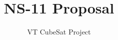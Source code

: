 \documentclass[12pt,a4paper]{article}
\author{VT CubeSat Project}
\title{NS-11 Proposal}
\begin{document}
\maketitle
\pagebreak
\tableofcontents
\pagebreak














\end{document}
